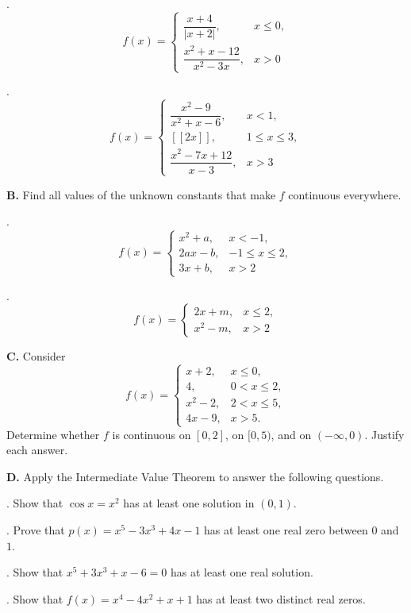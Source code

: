 .
\[
f(x) = \begin{cases}
\dfrac{x + 4}{|x + 2|}, & x \le 0, \\[10pt]
\dfrac{x^{2} + x - 12}{x^{2} - 3x}, & x > 0
\end{cases}
\]

.
\[
f(x) = \begin{cases}
\dfrac{x^{2} - 9}{x^{2} + x - 6}, & x < 1, \\[10pt]
[\![2x]\!], & 1 \le x \le 3, \\[8pt]
\dfrac{x^{2} - 7x + 12}{x - 3}, & x > 3
\end{cases}
\]

\bigskip
\noindent\textbf{B.} Find all values of the unknown constants that make \(f\) continuous everywhere.

.
\[
f(x) = \begin{cases}
x^{2} + a, & x < -1, \\[4pt]
2ax - b, & -1 \le x \le 2, \\[4pt]
3x + b, & x > 2
\end{cases}
\]

.
\[
f(x) = \begin{cases}
2x + m, & x \le 2, \\[4pt]
x^{2} - m, & x > 2
\end{cases}
\]

\bigskip
\noindent\textbf{C.} Consider
\[
f(x) = \begin{cases}
x + 2, & x \le 0, \\[4pt]
4, & 0 < x \le 2, \\[4pt]
x^{2} - 2, & 2 < x \le 5, \\[4pt]
4x - 9, & x > 5.
\end{cases}
\]
Determine whether \(f\) is continuous on \([0, 2]\), on \([0, 5)\), and on \((-\infty, 0)\). Justify each answer.

\pagebreak
\noindent\textbf{D.} Apply the Intermediate Value Theorem to answer the following questions.

. Show that \(\cos x = x^{2}\) has at least one solution in \((0, 1)\).

. Prove that \(p(x) = x^{5} - 3x^{3} + 4x - 1\) has at least one real zero between \(0\) and \(1\).

. Show that \(x^{5} + 3x^{3} + x - 6 = 0\) has at least one real solution.

. Show that \(f(x) = x^{4} - 4x^{2} + x + 1\) has at least two distinct real zeros.
